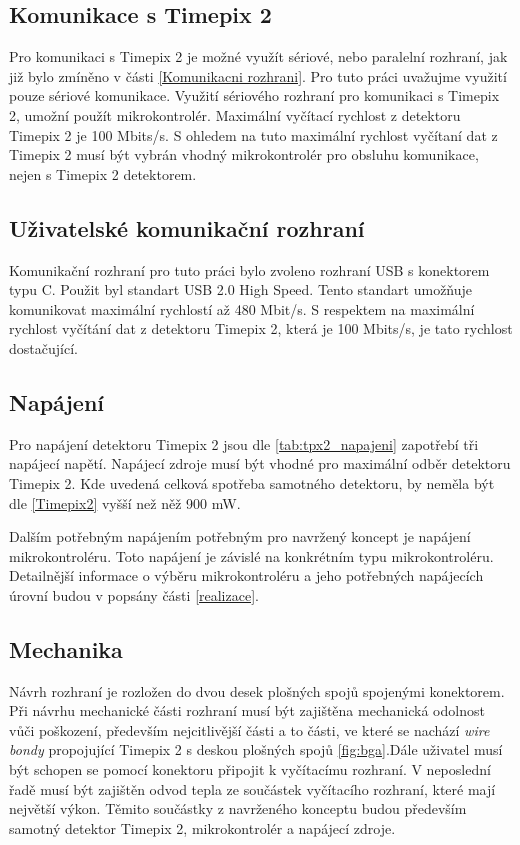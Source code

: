 \subsection{Komunikace s Timepix 2}
Pro komunikaci s Timepix 2 je možné využít sériové, nebo paralelní rozhraní, jak již bylo zmíněno v části \ref{Komunikacni rozhrani}. Pro tuto práci uvažujme využití pouze sériové komunikace. Využití sériového rozhraní pro komunikaci s Timepix 2, umožní použít mikrokontrolér. Maximální vyčítací rychlost z detektoru Timepix 2 je 100 Mbits/s. S ohledem na tuto maximální rychlost vyčítaní dat z Timepix 2 musí být vybrán vhodný mikrokontrolér pro obsluhu komunikace, nejen s Timepix 2 detektorem. 

\subsection{Uživatelské komunikační rozhraní}
Komunikační rozhraní pro tuto práci bylo zvoleno rozhraní USB s konektorem typu C. Použit byl standart USB 2.0 High Speed. Tento standart umožňuje komunikovat maximální rychlostí až 480 Mbit/s. S respektem na maximální rychlost vyčítání dat z detektoru Timepix 2, která je 100 Mbits/s, je tato rychlost dostačující. 

\subsection{Napájení}
Pro napájení detektoru Timepix 2 jsou dle \ref{tab:tpx2_napajeni} zapotřebí tři napájecí napětí. Napájecí zdroje musí být vhodné pro maximální odběr detektoru Timepix 2. Kde uvedená celková spotřeba samotného detektoru, by neměla být dle \ref{Timepix2} vyšší než něž 900 mW. 
\par Dalším potřebným napájením potřebným pro navržený koncept je napájení mikrokontroléru. Toto napájení je závislé na konkrétním typu mikrokontroléru. Detailnější informace o výběru mikrokontroléru a jeho potřebných napájecích úrovní budou v popsány části \ref{realizace}. 

\subsection{Mechanika}
Návrh rozhraní je rozložen do dvou desek plošných spojů spojenými konektorem. Při návrhu mechanické části rozhraní musí být zajištěna mechanická odolnost vůči poškození, především nejcitlivější části a to části, ve které se nachází \textit{wire bondy} propojující Timepix 2 s deskou plošných spojů \ref{fig:bga}.Dále uživatel musí být schopen se pomocí konektoru připojit k vyčítacímu rozhraní. V neposlední řadě musí být zajištěn odvod tepla ze součástek vyčítacího rozhraní, které mají největší výkon. Těmito součástky z navrženého konceptu budou především samotný detektor Timepix 2, mikrokontrolér a napájecí zdroje. 

